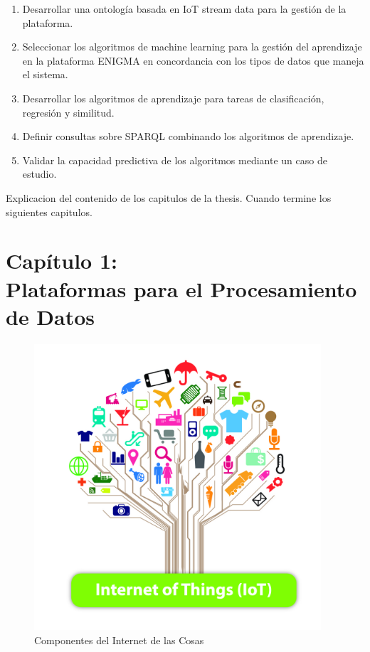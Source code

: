 \documentclass[12pt]{article}
\begin{document}
\begin{enumerate}
    \item {Desarrollar una ontología basada en IoT stream data para la gestión de la plataforma.
    }
    \item {
        Seleccionar los algoritmos de machine learning para la gestión del aprendizaje en la plataforma ENIGMA en concordancia con los tipos de datos que maneja el sistema.
    }
    \item {
        Desarrollar los algoritmos de aprendizaje para tareas de clasificación, regresión y similitud.
    }
    \item {
        Definir consultas sobre SPARQL combinando los algoritmos de aprendizaje.
    }
    \item {
        Validar la capacidad predictiva de los algoritmos mediante un caso de estudio.
    }
\end{enumerate}

Explicacion del contenido de los capitulos de la thesis. Cuando termine los siguientes capitulos.



\newpage
\vspace*{3cm}
\section[Plataformas para el Procesamiento de Datos]{\texorpdfstring{Cap\'itulo 1: \\ Plataformas para el Procesamiento\\ de Datos}{Cap\'itulo 1: Plataformas para el Procesamiento\\ de Datos}}
\vspace*{1cm}

\begin{figure}[!ht]
    \centering
    \includegraphics[width=0.95\textwidth]{imag/iot.jpg}
    \caption{Componentes del Internet de las Cosas \citep{ref39}}
    \label{fig:iot}
\end{figure}
\end{document}
